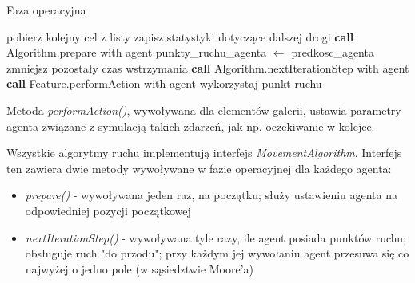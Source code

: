 \documentclass[a4paper, 12pt]{article}
\begin{document}
\begin{algorithm}
\caption{Faza operacyjna}
\label{alg2}
\begin{algorithmic}
            \State pobierz kolejny cel z listy
            \State zapisz statystyki dotyczące dalszej drogi
        \EndIf
    \EndFor
    \newline
        \State \textbf{call} Algorithm.prepare with agent
    \EndFor
    \newline
        \State punkty\_ruchu\_agenta $\gets$ predkosc\_agenta
    \EndFor
    \newline
                \State zmniejsz pozostały czas wstrzymania
                \State \textbf{call} Algorithm.nextIterationStep with agent
                \State \textbf{call} Feature.performAction with agent
                \State wykorzystaj punkt ruchu
            \EndIf
        \EndFor
    \EndFor
\EndProcedure
\end{algorithmic}
\end{algorithm}

Metoda \emph{performAction()}, wywoływana dla elementów galerii, ustawia parametry agenta związane z symulacją takich zdarzeń, jak np. oczekiwanie w kolejce. \newline

Wszystkie algorytmy ruchu implementują interfejs \emph{MovementAlgorithm}. Interfejs ten zawiera dwie metody wywoływane w fazie operacyjnej dla każdego agenta:
\begin{itemize}
\item \emph{prepare()} - wywoływana jeden raz, na początku; służy ustawieniu agenta na odpowiedniej pozycji początkowej
\item \emph{nextIterationStep()} - wywoływana tyle razy, ile agent posiada punktów ruchu; obsługuje ruch "do przodu"; przy każdym jej wywołaniu agent przesuwa się co najwyżej o jedno pole (w sąsiedztwie Moore'a)
\end{itemize}
\end{document}

